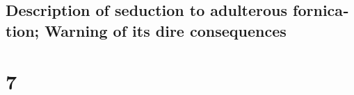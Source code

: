 \begin{paracol}{2}
\switchcolumn
\begin{otherlanguage}{english}

\hypertarget{description-of-seduction-to-adulterous-fornication-warning-of-its-dire-consequences}{%
\subsection{Description of seduction to adulterous fornication; Warning
of its dire
consequences}\label{description-of-seduction-to-adulterous-fornication-warning-of-its-dire-consequences}}

\hypertarget{section-13}{%
\section{7}\label{section-13}}


\end{otherlanguage}
\end{paracol}
